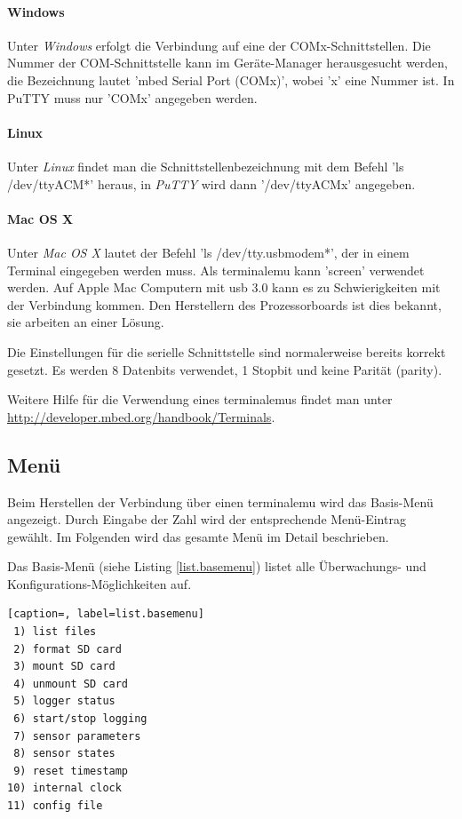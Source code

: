 \paragraph{Windows} Unter \emph{Windows} erfolgt die Verbindung auf eine der COMx-Schnittstellen. Die Nummer der COM-Schnittstelle kann im Geräte-Manager herausgesucht werden, die Bezeichnung lautet 'mbed Serial Port (COMx)', wobei 'x' eine Nummer ist. In PuTTY muss nur 'COMx' angegeben werden.

\paragraph{Linux} Unter \emph{Linux} findet man die Schnittstellenbezeichnung mit dem Befehl 'ls /dev/ttyACM*' heraus, in \emph{PuTTY} wird dann '/dev/ttyACMx' angegeben. 

\paragraph{Mac OS X} Unter \emph{Mac OS X} lautet der Befehl 'ls /dev/tty.usbmodem*', der in einem Terminal eingegeben werden muss. Als \gls{terminalemu} kann 'screen' verwendet werden. Auf Apple Mac Computern mit \gls{usb} 3.0 kann es zu Schwierigkeiten mit der Verbindung kommen. Den Herstellern des Prozessorboards ist dies bekannt, sie arbeiten an einer Lösung.

Die Einstellungen für die serielle Schnittstelle sind normalerweise bereits korrekt gesetzt. Es werden 8 Datenbits verwendet, 1 Stopbit und keine Parität (parity).

Weitere Hilfe für die Verwendung eines \gls{terminalemu}s findet man unter \url{http://developer.mbed.org/handbook/Terminals}.



\subsection{Menü}\label{ssec.menu}
Beim Herstellen der Verbindung über einen \gls{terminalemu} wird das Basis-Menü angezeigt. Durch Eingabe der Zahl wird der entsprechende Menü-Eintrag gewählt. Im Folgenden wird das gesamte Menü im Detail beschrieben.

Das Basis-Menü (siehe Listing \ref{list.basemenu}) listet alle Überwachungs- und Konfigurations-Möglichkeiten auf. 

\begin{lstlisting}[caption=, label=list.basemenu]
 1) list files
 2) format SD card
 3) mount SD card
 4) unmount SD card
 5) logger status
 6) start/stop logging
 7) sensor parameters
 8) sensor states
 9) reset timestamp
10) internal clock
11) config file
\end{lstlisting}

